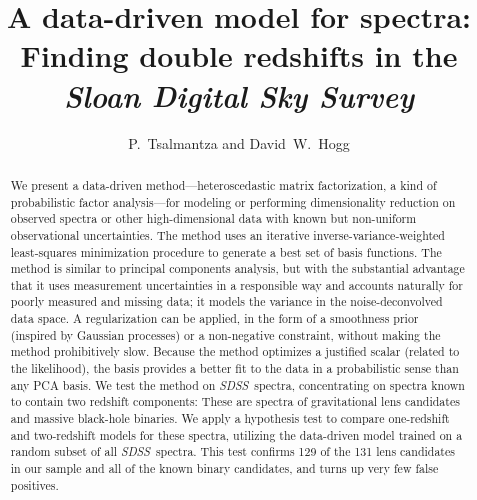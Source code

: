 \documentclass[12pt,preprint]{aastex}
\newcommand{\project}[1]{\textsl{#1}}
\newcommand{\sdss}{\project{SDSS}}
\newcommand{\SDSS}{\sdss}
\begin{document}
\sloppy

\title{A data-driven model for spectra:\\
       Finding double redshifts in the \project{Sloan Digital Sky Survey}}
\author{P.~Tsalmantza and David~W.~Hogg}

\begin{abstract}
We present a data-driven method---heteroscedastic matrix
factorization, a kind of probabilistic factor analysis---for modeling
or performing dimensionality reduction on observed spectra or other
high-dimensional data with known but non-uniform observational
uncertainties.  The method uses an iterative inverse-variance-weighted
least-squares minimization procedure to generate a best set of basis
functions.  The method is similar to principal components analysis,
but with the substantial advantage that it uses measurement
uncertainties in a responsible way and accounts naturally for poorly
measured and missing data; it models the variance in the
noise-deconvolved data space.  A regularization can be applied, in the
form of a smoothness prior (inspired by Gaussian processes) or a
non-negative constraint, without making the method prohibitively slow.
Because the method optimizes a justified scalar (related to the
likelihood), the basis provides a better fit to the data in a
probabilistic sense than any PCA basis.  We test the method on
\SDSS\ spectra, concentrating on spectra known to contain two redshift
components: These are spectra of gravitational lens candidates and
massive black-hole binaries. We apply a hypothesis test to
compare one-redshift and two-redshift models for these spectra,
utilizing the data-driven model trained on a random subset of all
\SDSS\ spectra.  This test confirms 129 of the 131 lens candidates in
our sample and all of the known binary candidates, and turns up very
few false positives.
\end{abstract}

\end{document}
